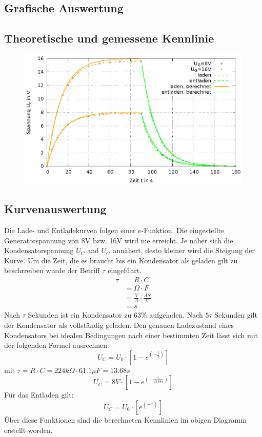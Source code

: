 \documentclass[
a4paper,     %
 headsepline, %
11pt         %
]{scrartcl}  %
\begin{document}
\begin{landscape}

\section{Grafische Auswertung}

\subsection{Theoretische und gemessene Kennlinie}
\begin{figure}[hbtp]
\centering
\includegraphics[scale=1.48]{kennlinie.eps}
\end{figure}

\end{landscape}

\subsection{Kurvenauswertung}
Die Lade- und Entladekurven folgen einer $e$-Funktion. Die eingestellte Generatorspannung von 8V bzw. 16V wird nie erreicht. Je näher sich die Kondensatorspannung $U_C$ and $U_G$ annähert, desto kleiner wird die Steigung der Kurve. Um die Zeit, die es braucht bis ein Kondensator als geladen gilt zu beschrreiben wurde der Betriff $\tau$ eingeführt.
\begin{align}
\tau &=R \cdot C \nonumber \\
     &=\Omega \cdot F \nonumber \\
     &=\frac{V}{A} \cdot \frac{AS}{V} \nonumber \\
     &= s \nonumber
\end{align}
Nach $\tau$ Sekunden ist ein Kondensator zu 63\% aufgeladen. Nach $5\tau$ Sekunden gilt der Kondensator als vollständig geladen.\newline
Den genauen Ladezustand eines Kondensators bei idealen Bedingungen nach einer bestimmten Zeit lässt sich mit der folgenden Formel ausrechnen:
\[U_C = U_0 \cdot [1-e^{(-\frac{t}{\tau})}]\]
mit $\tau = R\cdot C = 224k\Omega \cdot 61.1\mu F=13.68s$
\[U_C = 8V \cdot [1-e^{(-\frac{t}{13.68s})}]\]
Für das Entladen gilt:
\[U_C = U_0 \cdot [e^{(-\frac{t}{\tau})}]\]
Über diese Funktionen sind die berechneten Kennlinien im obigen Diagramm erstellt worden.
\end{document}
